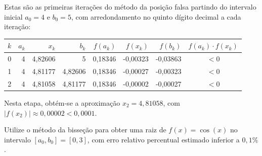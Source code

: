 \documentclass[12pt,a4paper]{article}
\begin{document}
\begin{ExerciseList}
Estas são as primeiras iterações do método da posição falsa partindo do intervalo inicial $a_0 = 4$ e $b_0 = 5$, com arredondamento no quinto dígito decimal a cada iteração:
\begin{center}
\begin{tabular}{|r|r|r|r|r|r|r|c|}
\hline
$k$ & $a_k$ & $x_k$ & $b_k$ & $f(a_k)$ & $f(x_k)$ & $f(b_k)$ & $f(a_k)\cdot f(x_k)$ \\
\hline
0 & 4 & 4,82606 & 5 & 0,18346 & -0,00323 & -0,03863 & $<0$ \\\hline
1 & 4 & 4,81177 & 4,82606 & 0,18346 & -0,00027 & -0,00323 & $<0$ \\\hline
2 & 4 & 4,81058 & 4,81177 & 0,18346 & -0,00002 & -0,00027 & $<0$ \\\hline
\end{tabular}
\end{center}
\medskip
Nesta etapa, obtém-se a aproximação $x_2 = 4,81058$, com $|f(x_2)| \approx 0,00002 < 0,0001$.


\Exercise[title={2,5}] Utilize o método da bisseção para obter uma raiz de $f(x) = \cos(x)$ no intervalo $[a_0, b_0] = [0, 3]$, com erro relativo percentual estimado inferior a $0,1\%$.


\end{ExerciseList}
\end{document}

